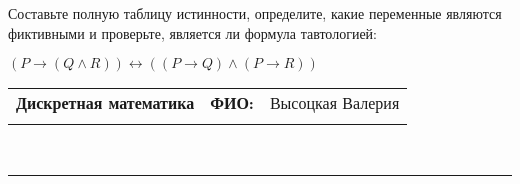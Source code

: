 \documentclass[10pt]{exam}
\newcommand{\class}{Дискретная математика}
\newcommand{\examdate}{}
\begin{document}
\begin{questions}
\begin{enumerate} [a)]
\end{enumerate}\question Составьте полную таблицу истинности, определите, какие переменные являются фиктивными и проверьте, является ли формула тавтологией:

$(P \rightarrow (Q \land R)) \leftrightarrow ((P \rightarrow Q) \land (P \rightarrow R))$

\end{questions}
\newpage
\begin{flushright}
\begin{tabular}{p{2.8in} r l}
\textbf{\class} & \textbf{ФИО:} &Высоцкая Валерия
\\

\textbf{\examdate} &&\\
\end{tabular}\\
\end{flushright}
\rule[1ex]{\textwidth}{.1pt}
\end{document}
